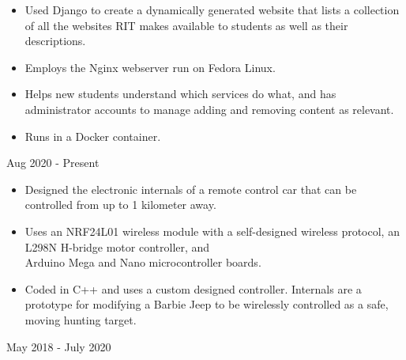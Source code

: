 \documentclass[11pt,letterpaper,ragged2e]{altacv}
\begin{document}

\begin{fullwidth}
\makecvheader
\end{fullwidth}



{
\begin{itemize}
    \item Used Django to create a dynamically generated website that lists a collection of all the websites RIT makes available to students as well as their descriptions.
    \item Employs the Nginx webserver run on Fedora Linux.
    \item Helps new students understand which services do what, and has administrator accounts to manage adding and removing content as relevant.
    \item Runs in a Docker container.
\end{itemize}
}
{Aug 2020 - Present}


{
\begin{itemize}
    \item Designed the electronic internals of a remote control car that can be controlled from up to 1 kilometer away.
    \item Uses an NRF24L01 wireless module with a self-designed wireless protocol, an L298N H-bridge motor controller, and \\ Arduino Mega and Nano microcontroller boards.
    \item Coded in C++ and uses a custom designed controller. Internals are a prototype for modifying a Barbie Jeep to be wirelessly controlled as a safe, moving hunting target.
\end{itemize}
}
{May 2018 - July 2020}
\end{document}
